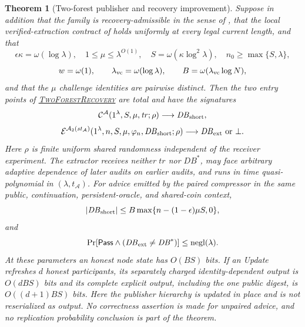 \documentclass[11pt]{article}
\newtheorem{theorem}{Theorem}[section]
\begin{document}
\begin{theorem}[Two-forest publisher and recovery improvement]
Suppose in addition that the family is recovery-admissible in the sense of
, that the local verified-extraction contract of
 holds uniformly at every legal current length, and
that
\[
 \epsilon\kappa=\omega(\log\lambda),\quad
 1\le\mu\le\lambda^{O(1)},\quad
 S=\omega(\kappa\log^2\lambda),\quad
 n_0\ge\max\{S,\lambda\},
\]
\[
 w=\omega(1),\qquad
 \lambda_{\rm vc}=\omega(\log\lambda),\qquad
 B=\omega(\lambda_{\rm vc}\log N),
\]
and that the $\mu$ challenge identities are pairwise distinct.  Then the two
entry points of
\hyperref[alg:recovery]{\textsc{TwoForestRecovery}} are total and have the
signatures
\[
 \mathcal C^{\mathcal A}(1^\lambda,S,\mu,\mathit{tr};\rho)
      \longrightarrow\mathit{DB}_{\rm short},
\]
\[
 \mathcal E^{\mathcal A_2(\mathit{st}_{\mathcal A})}
 (1^\lambda,n,S,\mu,\varphi_n,\mathit{DB}_{\rm short};\rho)
      \longrightarrow\mathit{DB}_{\rm ext}\ \text{or }\bot.
\]
Here $\rho$ is finite uniform shared randomness independent of the receiver
experiment.  The extractor receives neither $\mathit{tr}$ nor
$\mathit{DB}^{*}$, may face arbitrary adaptive dependence of later audits on
earlier audits, and runs in time quasi-polynomial in
$(\lambda,t_{\mathcal A})$.  For advice emitted by the paired compressor in the
same public, continuation, persistent-oracle, and shared-coin context,
\[
 |\mathit{DB}_{\rm short}|
 \le B\max\{n-(1-\epsilon)\mu S,0\},
\]
and
\[
\Pr[\mathsf{Pass}\wedge
       (\mathit{DB}_{\rm ext}\ne\mathit{DB}^{*})]
 \le\operatorname{negl}(\lambda).
\]
At these parameters an honest node state has $O(BS)$ bits.  If an Update
refreshes $d$ honest participants, its separately charged identity-dependent
output is $O(dBS)$ bits and its complete explicit output, including the one
public digest, is $O((d+1)BS)$ bits.  Here the publisher hierarchy is updated
in place and is not reserialized as output.
No correctness assertion is made for unpaired advice, and no replication
probability conclusion is part of the theorem.
\end{theorem}
\end{document}

